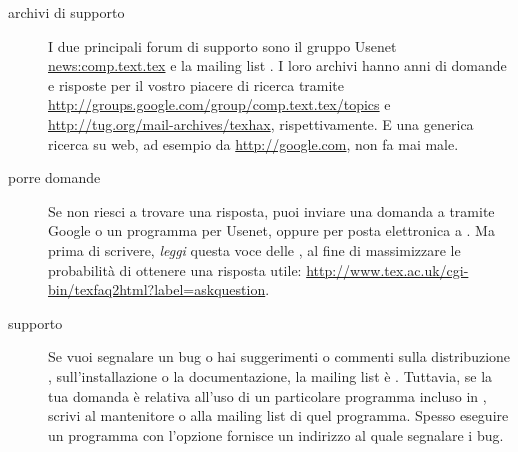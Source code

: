 \documentclass{article}
\begin{document}
\begin{description}
\item [archivi di supporto] I due principali forum di supporto sono il
  gruppo Usenet \url{news:comp.text.tex} e la mailing list
  . I loro archivi hanno anni di domande e risposte
  per il vostro piacere di ricerca tramite
  \url{http://groups.google.com/group/comp.text.tex/topics} e
  \url{http://tug.org/mail-archives/texhax}, rispettivamente. E una
  generica ricerca su web, ad esempio da \url{http://google.com}, non fa
  mai male.

\item [porre domande] Se non riesci a trovare una risposta, puoi inviare
  una domanda a  tramite Google o un programma per
  Usenet, oppure per posta elettronica a . Ma prima
  di scrivere, \emph{leggi} questa voce delle , al fine di
  massimizzare le probabilità di ottenere una risposta utile:
  \url{http://www.tex.ac.uk/cgi-bin/texfaq2html?label=askquestion}.

\item [supporto \TL{}] Se vuoi segnalare un bug o hai suggerimenti o
  commenti sulla distribuzione \TL{}, sull'installazione o la
  documentazione, la mailing list è . Tuttavia, se
  la tua domanda è relativa all'uso di un particolare programma incluso in
  \TL{}, scrivi al mantenitore o alla mailing list di quel programma.
  Spesso eseguire un programma con l'opzione  fornisce un
  indirizzo al quale segnalare i bug.

\end{description}
\end{document}
